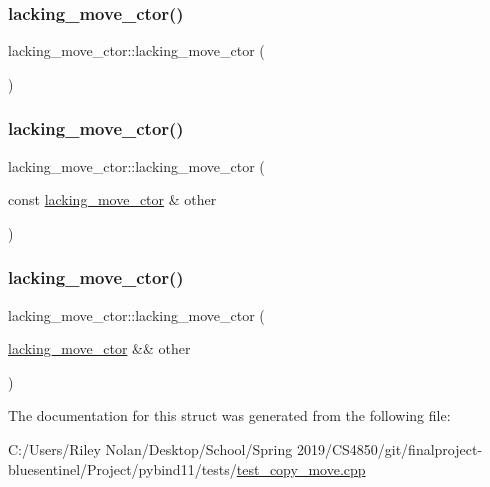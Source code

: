 \subsubsection{\texorpdfstring{lacking\_move\_ctor()}{lacking\_move\_ctor()}\hspace{0.1cm}{\footnotesize\ttfamily [1/3]}}
{\footnotesize\ttfamily lacking\+\_\+move\+\_\+ctor\+::lacking\+\_\+move\+\_\+ctor (\begin{DoxyParamCaption}{ }\end{DoxyParamCaption})\hspace{0.3cm}{\ttfamily [inline]}}

\mbox{\label{structlacking__move__ctor_ab4782da2d7f5916c7c3751f15b85a3d5}} 
\subsubsection{\texorpdfstring{lacking\_move\_ctor()}{lacking\_move\_ctor()}\hspace{0.1cm}{\footnotesize\ttfamily [2/3]}}
{\footnotesize\ttfamily lacking\+\_\+move\+\_\+ctor\+::lacking\+\_\+move\+\_\+ctor (\begin{DoxyParamCaption}\item[{const \mbox{\hyperlink{structlacking__move__ctor}{lacking\+\_\+move\+\_\+ctor}} \&}]{other }\end{DoxyParamCaption})\hspace{0.3cm}{\ttfamily [delete]}}

\mbox{\label{structlacking__move__ctor_aeeeb388b62f59ce44d884289008dbd27}} 
\subsubsection{\texorpdfstring{lacking\_move\_ctor()}{lacking\_move\_ctor()}\hspace{0.1cm}{\footnotesize\ttfamily [3/3]}}
{\footnotesize\ttfamily lacking\+\_\+move\+\_\+ctor\+::lacking\+\_\+move\+\_\+ctor (\begin{DoxyParamCaption}\item[{\mbox{\hyperlink{structlacking__move__ctor}{lacking\+\_\+move\+\_\+ctor}} \&\&}]{other }\end{DoxyParamCaption})\hspace{0.3cm}{\ttfamily [delete]}}



The documentation for this struct was generated from the following file\+:\begin{DoxyCompactItemize}
\item 
C\+:/\+Users/\+Riley Nolan/\+Desktop/\+School/\+Spring 2019/\+C\+S4850/git/finalproject-\/bluesentinel/\+Project/pybind11/tests/\mbox{\hyperlink{test__copy__move_8cpp}{test\+\_\+copy\+\_\+move.\+cpp}}\end{DoxyCompactItemize}

